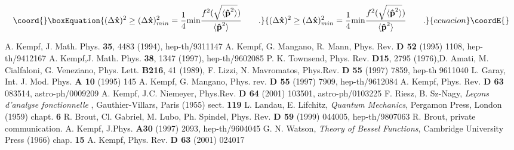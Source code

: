 \documentclass[a4paper,10pt]{article}
\providecommand{\x}{\mbox{\rm{\bf \^ x}}}
\providecommand{\p}{\mbox{\rm{\bf \^ p}}}
\begin{document}
\begin{equation}\coord{}\boxEquation{ (\Delta\x)^2\geq(\Delta\x)^2_{min}=\frac 14 {\rm
min}\frac{f^2(\sqrt{\langle\p^2\rangle})}{\langle\p^2\rangle}\qquad
.\label{fsp}
}{ (\Delta\x)^2\geq(\Delta\x)^2_{min}=\frac 14 {\rm
min}\frac{f^2(\sqrt{\langle\p^2\rangle})}{\langle\p^2\rangle}\qquad
.}{ecuacion}\coordE{}\end{equation} \begin{thebibliography}{00}
 A. Kempf, J. Math. Phys. {\bf 35}, 4483 (1994), hep-th/9311147
 A. Kempf, G. Mangano, R. Mann, Phys. Rev. {\bf D 52}
(1995) 1108, hep-th/9412167
 A. Kempf,J. Math. Phys. {\bf 38}, 1347 (1997), hep-th/9602085
 P. K. Townsend, Phys. Rev. {\bf D15},
2795 (1976),D. Amati, M. Cialfaloni, G. Veneziano, Phys. Lett.
{\bf B216}, 41 (1989), F. Lizzi, N. Mavromatos, Phys.Rev. {\bf D
55} (1997) 7859, hep-th 9611040
 L. Garay, Int. J. Mod. Phys. {\bf A 10} (1995) 145
 A. Kempf, G. Mangano, Phys. rev. {\bf D 55} (1997) 7909,
hep-th/9612084
 A. Kempf, Phys. Rev. {\bf D 63} 083514,
astro-ph/0009209
 A. Kempf, J.C. Niemeyer, Phys.Rev. {\bf D 64} (2001)
103501, astro-ph/0103225
F. Riesz, B. Sz-Nagy, {\it Le\c{c}ons d'analyse
fonctionnelle} , Gauthier-Villars, Paris (1955) sect. {\bf 119}
L. Landau, E. Lifchitz, {\it Quantum Mechanics}, Pergamon
Press, London (1959) chapt. {\bf 6}
 R. Brout, Cl. Gabriel, M. Lubo, Ph. Spindel, Phys.
Rev. {\bf D 59} (1999) 044005, hep-th/9807063
 R. Brout, private communication.
 A. Kempf, J.Phys. {\bf A30} (1997) 2093,
hep-th/9604045
G. N. Watson, {\it Theory of Bessel Functions}, Cambridge
University Press (1966) chap. {\bf 15}
 A. Kempf, Phys. Rev. {\bf D 63} (2001) 024017
\end{thebibliography}
\end{document}
